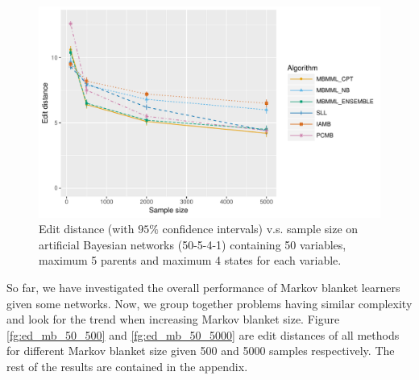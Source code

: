 \begin{figure}[H]
  \centering
    \includegraphics[scale=0.6]{figures/ed_vs_samplesize_50_5_4_1.pdf}
  \caption{Edit distance (with $95\%$ confidence intervals) v.s. sample size on artificial Bayesian networks (50-5-4-1) containing 50 variables, maximum 5 parents and maximum 4 states for each variable.}
  \label{fg:50}
\end{figure}

So far, we have investigated the overall performance of Markov blanket learners given some networks. Now, we group together problems having similar complexity and look for the trend when increasing Markov blanket size. Figure \ref{fg:ed_mb_50_500} and \ref{fg:ed_mb_50_5000} are edit distances of all methods for different Markov blanket size given 500 and 5000 samples respectively. The rest of the results are contained in the appendix.  

